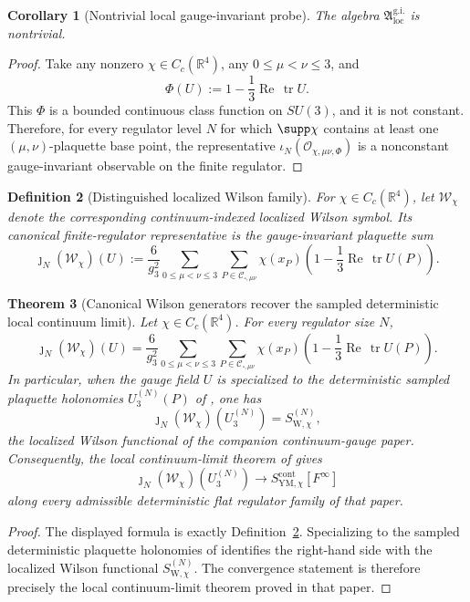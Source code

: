 \documentclass[11pt]{article}
\newtheorem{theorem}{Theorem}[section]
\newtheorem{definition}[theorem]{Definition}
\newtheorem{corollary}[theorem]{Corollary}
\theoremstyle{remark}
\newcommand{\R}{\mathbb R}
\newcommand{\tr}{\operatorname{tr}}
\newcommand{\Ree}{\operatorname{Re}}
\begin{document}
\begin{corollary}[Nontrivial local gauge-invariant probe]
\label{cor:continuum-plaquette-nontrivial}
The algebra \(\mathfrak A_{\mathrm{loc}}^{\mathrm{g.i.}}\) is nontrivial.
\end{corollary}

\begin{proof}
Take any nonzero \(\chi\in C_c(\R^4)\), any \(0\le\mu<\nu\le3\), and
\[
\Phi(U):=1-\frac13\Ree\,\tr U.
\]
This \(\Phi\) is a bounded continuous class function on \(SU(3)\), and it is
not constant.  Therefore, for every regulator level \(N\) for which
\(\supp\chi\) contains at least one \((\mu,\nu)\)-plaquette base point,
the representative
\(\iota_N(\mathcal O_{\chi,\mu\nu,\Phi})\) is a nonconstant gauge-invariant
observable on the finite regulator.
\end{proof}

\begin{definition}[Distinguished localized Wilson family]
\label{def:wilson-density-generators}
For \(\chi\in C_c(\R^4)\), let \(\mathcal W_\chi\) denote the corresponding
continuum-indexed localized Wilson symbol.  Its canonical finite-regulator
representative is the gauge-invariant plaquette sum
\[
\jmath_N(\mathcal W_\chi)(U)
:=
\frac{6}{g_3^2}
\sum_{0\le\mu<\nu\le3}\sum_{P\in\mathcal C_{\square,\mu\nu}}
\chi(x_P)\left(1-\frac13\Ree\,\tr U(P)\right).
\]
\end{definition}

\begin{theorem}[Canonical Wilson generators recover the sampled deterministic local continuum limit]
\label{thm:wilson-generator-limit}
Let \(\chi\in C_c(\R^4)\).  For every regulator size \(N\),
\[
\jmath_N(\mathcal W_\chi)(U)
=
\frac{6}{g_3^2}
\sum_{0\le\mu<\nu\le3}\sum_{P\in\mathcal C_{\square,\mu\nu}}
\chi(x_P)\left(1-\frac13\Ree\,\tr U(P)\right).
\]
In particular, when the gauge field \(U\) is specialized to the deterministic
sampled plaquette holonomies \(U_3^{(N)}(P)\) of \cite{continuumqft}, one has
\[
\jmath_N(\mathcal W_\chi)(U_3^{(N)})
=
S_{\mathrm W,\chi}^{(N)},
\]
the localized Wilson functional of the companion continuum-gauge paper.
Consequently, the local continuum-limit theorem of \cite{continuumqft} gives
\[
\jmath_N(\mathcal W_\chi)(U_3^{(N)})
\longrightarrow
S_{\mathrm{YM},\chi}^{\mathrm{cont}}[F^\infty]
\]
along every admissible deterministic flat regulator family of that paper.
\end{theorem}

\begin{proof}
The displayed formula is exactly Definition~\ref{def:wilson-density-generators}.
Specializing to the sampled deterministic
plaquette holonomies of \cite{continuumqft} identifies the right-hand side with
the localized Wilson functional \(S_{\mathrm W,\chi}^{(N)}\).  The convergence
statement is therefore precisely the local continuum-limit theorem proved in
that paper.
\end{proof}
\end{document}

